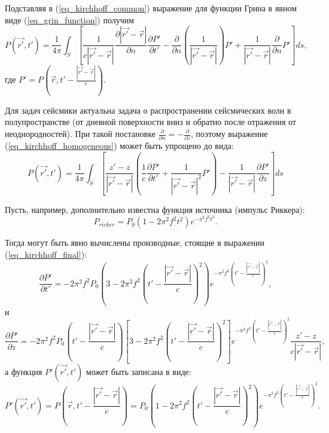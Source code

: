 \documentclass{article}
\begin{document}
Подставляя в (\ref{eq_kirchhoff_common}) выражение для функции Грина в явном виде (\ref{eq_grin_function}) получим
\begin{equation}
\label{eq_kirchhoff_homogeneous}
P(\vec{r'}, t') = \frac{1}{4\pi} \int_S [\frac{1}{c|\vec{r'} - \vec{r}|}
\frac{\partial |\vec{r'} - \vec{r}|}{\partial n}\frac{\partial P'}{\partial t'}
- \frac{\partial}{\partial n}(\frac{1}{|\vec{r'} - \vec{r}|}) P' + 
\frac{1}{|\vec{r'} - \vec{r}|}\frac{\partial}{\partial n}P'] ds,
\end{equation}
где $P' = P(\vec{r}, t' - \frac{|\vec{r'} - \vec{r}|}{c})$.
 
Для задач сейсмики актуальна задача о распространении сейсмических волн в полупространстве (от дневной поверхности вниз и обратно после отражения от неоднородностей).
При такой постановке $\frac{\partial}{\partial n} = -\frac{\partial}{\partial z}$, поэтому выражение (\ref{eq_kirchhoff_homogeneous}) может быть упрощено до вида:
\begin{equation}
\label{eq_kirchhoff_final}
P(\vec{r'}, t') = \frac{1}{4\pi} \int_S [\frac{z' - z}{|\vec{r'} - \vec{r}|}(\frac{1}{c}
\frac{\partial P'}{\partial t'} + \frac{1}{|\vec{r'} - \vec{r}|^2} P') - \frac{1}{|\vec{r'}
- \vec{r}|}\frac{\partial P'}{\partial z}] ds
\end{equation}

Пусть, например, дополнительно известна функция источника (импульс Риккера):
\begin{equation}
\label{eq_ricker_wavelet}
P_{ricker} = P_0(1-2 \pi^2f^2t^2)e^{-\pi^2f^2t^2}.
\end{equation}

Тогда могут быть явно вычислены производные, стоящие в выражении (\ref{eq_kirchhoff_final}):
\begin{equation}
\label{eq_dp'_dt'}
\frac{\partial P'}{\partial t'} = -2\pi^2f^2P_0(3-2 \pi^2f^2(t' - \frac{|\vec{r'} - \vec{r}|}{c})^2)e^{-\pi^2f^2(t' - \frac{|\vec{r'} - \vec{r}|}{c})^2},
\end{equation}
и
\begin{equation}
\label{eq_dp'_dz}
\frac{\partial P'}{\partial z} = -2\pi^2f^2P_0(t' - \frac{|\vec{r'} - \vec{r}|}{c})[3-2 \pi^2f^2(t' - \frac{|\vec{r'} - \vec{r}|}{c})^2]e^{-\pi^2f^2(t' - \frac{|\vec{r'} - \vec{r}|}{c})^2}
\frac{z'-z}{c|\vec{r'}-\vec{r}|},
\end{equation}
а функция $P'(\vec{r'}, t')$ может быть записана в виде:
\begin{equation}
\label{eq_surface_pressure}
P'(\vec{r'}, t') = P(\vec{r}, t' - \frac{|\vec{r'} - \vec{r}|}{c}) = P_0(1-2 \pi^2f^2(t' - \frac{|\vec{r'} - \vec{r}|}{c})^2)e^{-\pi^2f^2(t'-\frac{|\vec{r'} - \vec{r}|}{c})^2}.
\end{equation}
\end{document}

